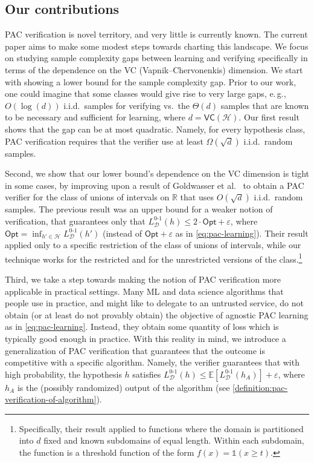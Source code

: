 \documentclass[11pt]{article}
\numberwithin{equation}{section}
\theoremstyle{definition}
\theoremstyle{plain}
\newcommand{\eg}{e.\,g.}
\theoremstyle{definition}\newtheorem{notation}[theorem]{Notation}\theoremstyle{plain}\raggedbottom
\newcommand{\roundBrackets}[1]{
	\mathopen{}\left(#1\right)\mathclose{}
}
\newcommand{\squareBrackets}[1]{
	\mathopen{}\left[#1\right]\mathclose{}
}
\newcommand{\customFunctionRound}[2]{
	#1\roundBrackets{#2}
}
\newcommand{\customFunctionSquare}[2]{
	#1\squareBrackets{#2}
}
\newcommand{\sfFunction}[2]{
	\customFunctionRound{\mathsf{#1}}{#2}
}
\newcommand{\bbFunction}[2]{
	\customFunctionSquare{\mathbb{#1}}{#2}
}
\newcommand{\OmegaOf}[1]{\Omega\roundBrackets{#1}}
\newcommand{\ThetaOf}[1]{\Theta\roundBrackets{#1}}
\newcommand{\BigO}[1]{O\roundBrackets{#1}}
\newcommand{\EE}[1]{\bbFunction{E}{#1}}
\newcommand{\LossIndicator}[2]{\LossIndicatorNameEmpty_{#1}\roundBrackets{#2}}
\newcommand{\LossIndicatorNameEmpty}{L^{0\text{-}1}}
\newcommand{\Opt}{\mathsf{Opt}}
\newcommand{\VC}[1]{\sfFunction{VC}{#1}}
\newcommand{\bbR}{\mathbb{R}}
\newcommand{\cD}{\mathcal{D}}
\newcommand{\cH}{\mathcal{H}}
\newcommand{\1}{\mathds{1}}
\begin{document}
\subsection{Our contributions}

PAC verification is novel territory, and very little is currently known. The current paper aims to make some modest steps towards charting this landscape. We focus on studying sample complexity gaps between learning and verifying specifically in terms of the dependence on the VC (Vapnik--Chervonenkis) dimension. 
We start with showing a lower bound for the sample complexity gap. Prior to our work, one could imagine that some classes would give rise to very large gaps, \eg, $\BigO{\log(d)}$ i.i.d.\ samples for verifying vs.\ the $\ThetaOf{d}$ samples that are known to be necessary and sufficient for learning, where $d = \VC{\cH}$. Our first result shows that the gap can be at most quadratic. Namely, for every hypothesis class, PAC verification requires that the verifier use at least $\OmegaOf{\sqrt{d}}$ i.i.d.\ random samples.

Second, we show that our lower bound's dependence on the VC dimension is tight in some cases, by improving upon a result of Goldwasser et al.\ \cite{GoldwasserRSY21} to obtain a PAC verifier for the class of unions of intervals on $\bbR$ that uses $\BigO{\sqrt{d}}$ i.i.d.\ random samples. The previous result was an upper bound for a weaker notion of verification, that guarantees only that $\LossIndicator{\cD}{h} \leq 2\cdot \Opt + \varepsilon$, where $\Opt = \inf_{h' \in \cH} \LossIndicator{\cD}{h'}$ (instead of $\Opt + \varepsilon$ as in \cref{eq:pac-learning}). Their result applied only to a specific restriction of the class of unions of intervals, while our technique works for the restricted and for the unrestricted versions of the class.\footnote{%
	Specifically, their result applied to functions where the domain is partitioned into $d$ fixed and known subdomains of equal length. Within each subdomain, the function is a threshold function of the form $f(x) = \1(x \geq t)$.%
}

Third, we take a step towards making the notion of PAC verification more applicable in practical settings. Many ML and data science algorithms that people use in practice, and might like to delegate to an untrusted service, do not obtain (or at least do not provably obtain) the objective of agnostic PAC learning as in \cref{eq:pac-learning}. Instead, they obtain some quantity of loss which is typically good enough in practice. With this reality in mind, we introduce a generalization of PAC verification that guarantees that the outcome is competitive with a specific algorithm. Namely, the verifier guarantees that with high probability, the hypothesis $h$ satisfies $\LossIndicator{\cD}{h} \leq \EE{\LossIndicator{\cD}{h_A}} + \varepsilon$, where $h_A$ is the (possibly randomized) output of the algorithm (see \cref{definition:pac-verification-of-algorithm}).
\end{document}
